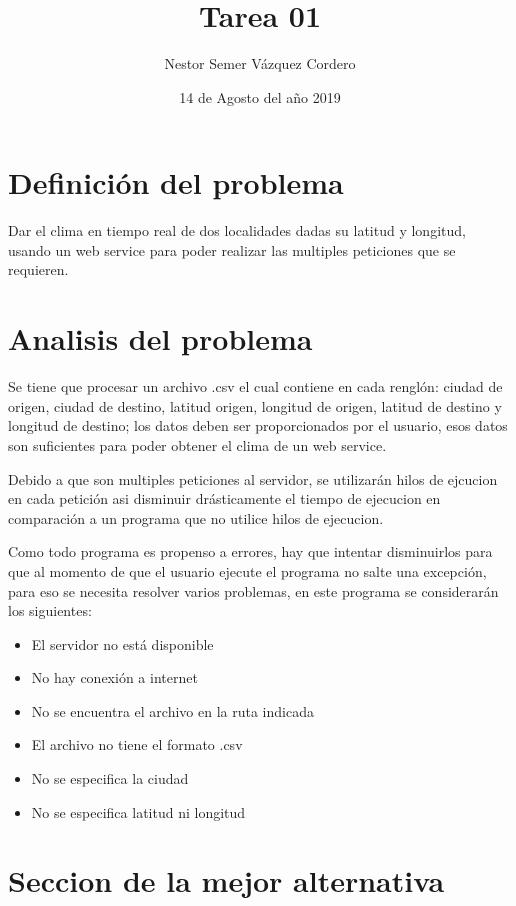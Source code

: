 \documentclass{article}
\title{Tarea 01}
\author{Nestor Semer V\'azquez Cordero}
\date{14 de Agosto del a\~no 2019}
\begin{document}

\maketitle

\section{Definici\'on del problema}

Dar el clima en tiempo real de dos localidades dadas su latitud y longitud, 
usando un web service para poder realizar las multiples peticiones que se requieren.

\section{Analisis del problema}
Se tiene que procesar un archivo .csv el cual contiene en cada rengl\'on: ciudad de origen, 
ciudad de destino, latitud origen, longitud de origen, latitud de destino y longitud de destino;
los datos deben ser proporcionados por el usuario, esos datos son suficientes para poder obtener el clima 
de un web service.

Debido a que son multiples peticiones al servidor, se utilizar\'an hilos de ejcucion en cada petici\'on
asi disminuir dr\'asticamente el tiempo de ejecucion en comparaci\'on a un programa que no
utilice hilos de ejecucion.

Como todo programa es propenso a errores, hay que intentar disminuirlos
para que al momento de que el usuario ejecute el programa no salte una excepci\'on, para eso se necesita resolver varios problemas, en este programa se considerar\'an los siguientes:

\begin{itemize}
 \item El servidor no est\'a disponible
 \item No hay conexi\'on a internet
 \item No se encuentra el archivo en la ruta indicada
 \item El archivo no tiene el formato .csv
 \item No se especifica la ciudad
 \item No se especifica latitud ni longitud
 \end{itemize}

\section{Seccion de la mejor alternativa}
\end{document}
